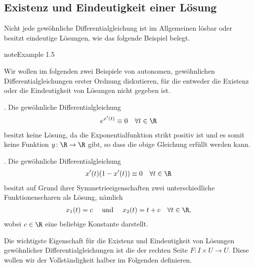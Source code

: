 \documentclass[letterpaper,10pt,german]{jupyterBook}
\begin{document}
\subsection{Existenz und Eindeutigkeit einer Lösung}
\label{\detokenize{ode/repetition:existenz-und-eindeutigkeit-einer-losung}}
\sphinxAtStartPar
Nicht jede gewöhnliche Differentialgleichung ist im Allgemeinen lösbar oder besitzt eindeutige Lösungen, wie das folgende Beispiel belegt.
\label{ode/repetition:example-7}
\begin{sphinxadmonition}{note}{Example 1.5}



\sphinxAtStartPar
Wir wollen im folgenden zwei Beispiele von autonomen, gewöhnlichen Differentialgleichungen erster Ordnung diskutieren, für die entweder die Existenz oder die Eindeutigkeit von Lösungen nicht gegeben ist.

. Die gewöhnliche Differentialgleichung
\begin{equation*}
\begin{split}e^{x'(t)} \equiv 0 \quad \forall t \in \R\end{split}
\end{equation*}
\sphinxAtStartPar
besitzt keine Lösung, da die Exponentialfunktion strikt positiv ist und es somit keine Funktion \(y \colon \R \rightarrow \R\) gibt, so dass die obige Gleichung erfüllt werden kann.

. Die gewöhnliche Differentialgleichung
\begin{equation*}
\begin{split}x'(t)(1-x'(t)) \equiv 0 \quad \forall t \in \R\end{split}
\end{equation*}
\sphinxAtStartPar
besitzt auf Grund ihrer Symmetrieeigenschaften zwei unterschiedliche Funktionenscharen als Lösung, nämlich
\begin{equation*}
\begin{split}x_1(t) = c \quad \text{ und } \quad x_2(t) = t + c \quad \forall t \in \R,\end{split}
\end{equation*}
\sphinxAtStartPar
wobei \(c \in \R\) eine beliebige Konstante darstellt.
\end{sphinxadmonition}

\sphinxAtStartPar
Die wichtigste Eigenschaft für die Existenz und Eindeutigkeit von Lösungen gewöhnlicher Differentialgleichungen ist die  der rechten Seite \(F \colon I \times U \rightarrow U\).
Diese wollen wir der Vollständigkeit halber im Folgenden definieren.
\end{document}
